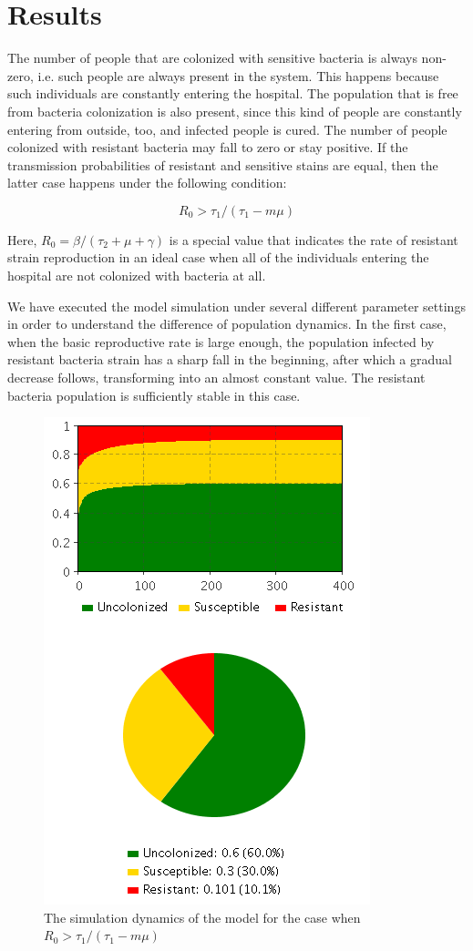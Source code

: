 \chapter{Results}

The number of people that are colonized with sensitive bacteria is always non-zero, i.e. such people are always present in the system. This happens because such individuals are constantly entering the hospital. The population that is free from bacteria colonization is also present, since this kind of people are constantly entering from outside, too, and infected people is cured. The number of people colonized with resistant bacteria may fall to zero or stay positive. If the transmission probabilities of resistant and sensitive stains are equal, then the latter case happens under the following condition:

\begin{equation}
R_0 > \tau_1/(\tau_1 - m \mu)
\end{equation}

Here, $R_0 = \beta/(\tau_2 + \mu + \gamma)$ is a special value that indicates the rate of resistant strain reproduction in an ideal case when all of the individuals entering the hospital are not colonized with bacteria at all.

We have executed the model simulation under several different parameter settings in order to understand the difference of population dynamics. In the first case, when the basic reproductive rate is large enough, the population infected by resistant bacteria strain has a sharp fall in the beginning, after which a gradual decrease follows, transforming into an almost constant value. The resistant bacteria population is sufficiently stable in this case.

\begin{figure}[H]
  \centering
  \includegraphics[height=0.7\textwidth]{img/screens/result/result1}
  \caption{The simulation dynamics of the model for the case when $R_0 > \tau_1/(\tau_1 - m \mu)$}
\end{figure}

